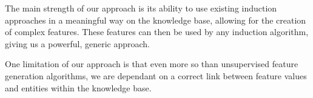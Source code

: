 \documentclass{article}
\theoremstyle{definition}
\begin{document}
The main strength of our approach is its ability to use existing induction approaches in a meaningful way on the knowledge base, allowing for the creation of complex features. These features can then be used by any induction algorithm, giving us a powerful, generic approach.

One limitation of our approach is that even more so than unsupervised feature generation algorithms,  we are dependant on a correct link between feature values and entities within the knowledge base. %


\clearpage


\end{document}
